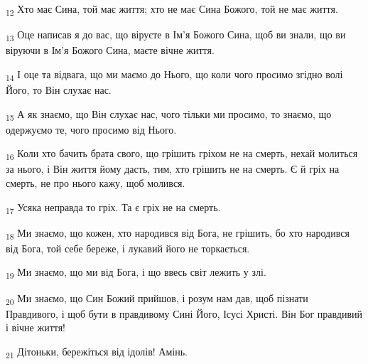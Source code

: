 \begin{tcolorbox}
\textsubscript{12} Хто має Сина, той має життя; хто не має Сина Божого, той не має життя.
\end{tcolorbox}
\begin{tcolorbox}
\textsubscript{13} Оце написав я до вас, що віруєте в Ім'я Божого Сина, щоб ви знали, що ви віруючи в Ім'я Божого Сина, маєте вічне життя.
\end{tcolorbox}
\begin{tcolorbox}
\textsubscript{14} І оце та відвага, що ми маємо до Нього, що коли чого просимо згідно волі Його, то Він слухає нас.
\end{tcolorbox}
\begin{tcolorbox}
\textsubscript{15} А як знаємо, що Він слухає нас, чого тільки ми просимо, то знаємо, що одержуємо те, чого просимо від Нього.
\end{tcolorbox}
\begin{tcolorbox}
\textsubscript{16} Коли хто бачить брата свого, що грішить гріхом не на смерть, нехай молиться за нього, і Він життя йому дасть, тим, хто грішить не на смерть. Є й гріх на смерть, не про нього кажу, щоб молився.
\end{tcolorbox}
\begin{tcolorbox}
\textsubscript{17} Усяка неправда то гріх. Та є гріх не на смерть.
\end{tcolorbox}
\begin{tcolorbox}
\textsubscript{18} Ми знаємо, що кожен, хто народився від Бога, не грішить, бо хто народився від Бога, той себе береже, і лукавий його не торкається.
\end{tcolorbox}
\begin{tcolorbox}
\textsubscript{19} Ми знаємо, що ми від Бога, і що ввесь світ лежить у злі.
\end{tcolorbox}
\begin{tcolorbox}
\textsubscript{20} Ми знаємо, що Син Божий прийшов, і розум нам дав, щоб пізнати Правдивого, і щоб бути в правдивому Сині Його, Ісусі Христі. Він Бог правдивий і вічне життя!
\end{tcolorbox}
\begin{tcolorbox}
\textsubscript{21} Дітоньки, бережіться від ідолів! Амінь.
\end{tcolorbox}
